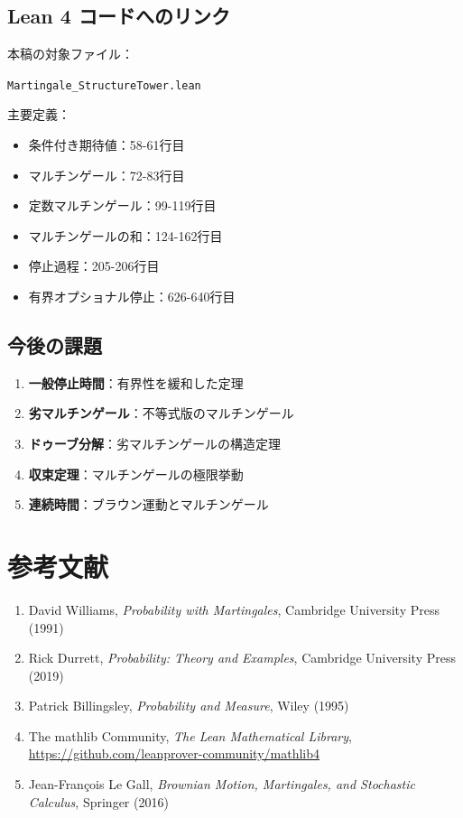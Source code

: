 \documentclass[12pt,a4paper]{article}
\theoremstyle{definition}
\begin{document}
\subsection{Lean 4 コードへのリンク}

本稿の対象ファイル：

\texttt{Martingale\_StructureTower.lean}

主要定義：

\begin{itemize}
\item 条件付き期待値：58-61行目
\item マルチンゲール：72-83行目
\item 定数マルチンゲール：99-119行目
\item マルチンゲールの和：124-162行目
\item 停止過程：205-206行目
\item 有界オプショナル停止：626-640行目
\end{itemize}

\subsection{今後の課題}

\begin{enumerate}
\item \textbf{一般停止時間}：有界性を緩和した定理
\item \textbf{劣マルチンゲール}：不等式版のマルチンゲール
\item \textbf{ドゥーブ分解}：劣マルチンゲールの構造定理
\item \textbf{収束定理}：マルチンゲールの極限挙動
\item \textbf{連続時間}：ブラウン運動とマルチンゲール
\end{enumerate}

\section*{参考文献}

\begin{enumerate}
\item David Williams, \textit{Probability with Martingales}, Cambridge University Press (1991)
\item Rick Durrett, \textit{Probability: Theory and Examples}, Cambridge University Press (2019)
\item Patrick Billingsley, \textit{Probability and Measure}, Wiley (1995)
\item The mathlib Community, \textit{The Lean Mathematical Library}, \url{https://github.com/leanprover-community/mathlib4}
\item Jean-François Le Gall, \textit{Brownian Motion, Martingales, and Stochastic Calculus}, Springer (2016)
\end{enumerate}
\end{document}
